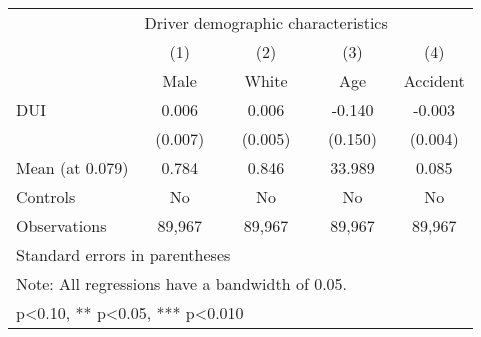 {
\def\sym#1{\ifmmode^{#1}\else\(^{#1}\)\fi}
\begin{tabular*}{0.7\hsize}{@{\hskip\tabcolsep\extracolsep\fill}l*{4}{c}}
\toprule
               &\multicolumn{3}{c}{Driver demographic characteristics}&\multicolumn{1}{c}{}\\\cmidrule(lr){2-4}\cmidrule(lr){2-4}
               &\multicolumn{1}{c}{(1)}&\multicolumn{1}{c}{(2)}&\multicolumn{1}{c}{(3)}&\multicolumn{1}{c}{(4)}\\
               &\multicolumn{1}{c}{Male}&\multicolumn{1}{c}{White}&\multicolumn{1}{c}{Age}&\multicolumn{1}{c}{Accident}\\
\midrule
DUI            &       0.006   &       0.006   &      -0.140   &      -0.003   \\
               &     (0.007)   &     (0.005)   &     (0.150)   &     (0.004)   \\

Mean (at 0.079)&       0.784   &       0.846   &      33.989   &       0.085   \\
Controls       &          No   &          No   &          No   &          No   \\
Observations   &      89,967   &      89,967   &      89,967   &      89,967   \\
\bottomrule
\multicolumn{5}{l}{\footnotesize Standard errors in parentheses}\\
\multicolumn{5}{l}{\footnotesize Note: All regressions have a bandwidth of 0.05.}\\
\multicolumn{5}{l}{\footnotesize * p<0.10, ** p<0.05, *** p<0.010}\\
\end{tabular*}
}
